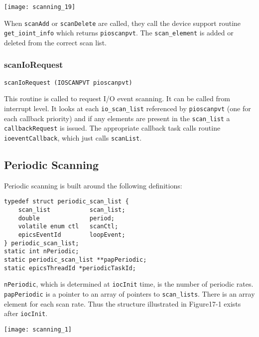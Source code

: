\begin{center}
\texttt{[image: scanning\_19]}
\end{center}

When \verb|scanAdd| or \verb|scanDelete| are called, they call the device support routine \verb|get_ioint_info| which returns 
\verb|pioscanpvt|. The \verb|scan_element| is added or deleted from the correct scan list. 

\subsubsection{scanIoRequest}

\begin{verbatim}
scanIoRequest (IOSCANPVT pioscanpvt)
\end{verbatim}

This routine is called to request I/O event scanning. It can be called from interrupt level. It looks at each \verb|io_scan_list| 
referenced by \verb|pioscanpvt| (one for each callback priority) and if any elements are present in the \verb|scan_list| a 
\verb|callbackRequest| is issued. The appropriate callback task calls routine \verb|ioeventCallback|, which just calls 
\verb|scanList|. 

\subsection{Periodic Scanning}

Periodic scanning is built around the following definitions:

\begin{verbatim}
typedef struct periodic_scan_list {
    scan_list           scan_list;
    double              period;
    volatile enum ctl   scanCtl;
    epicsEventId        loopEvent;
} periodic_scan_list;
static int nPeriodic;
static periodic_scan_list **papPeriodic;
static epicsThreadId *periodicTaskId;
\end{verbatim}

\verb|nPeriodic|, which is determined at \verb|iocInit| time, is the number of periodic rates. \verb|papPeriodic| is a pointer to an 
array of pointers to \verb|scan_lists|. There is an array element for each scan rate. Thus the structure illustrated in 
Figure17-1 exists after \verb|iocInit|.

\begin{center}
\texttt{[image: scanning\_1]}
\end{center}

